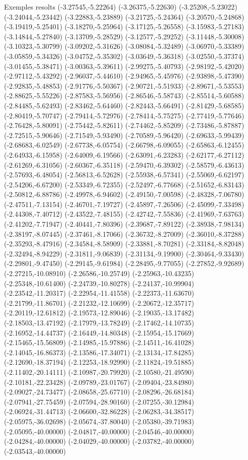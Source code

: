 \documentclass[11pt,a4paper]{article}
\begin{document}
\begin{fmex}{Exemples resolts}
(-3.27545,-5.22264) (-3.26375,-5.22630) (-3.25208,-5.23022) (-3.24044,-5.23442) (-3.22883,-5.23889) (-3.21725,-5.24364) (-3.20570,-5.24868) (-3.19419,-5.25401) (-3.18270,-5.25964) (-3.17125,-5.26558) (-3.15983,-5.27183) (-3.14844,-5.27840) (-3.13709,-5.28529) (-3.12577,-5.29252) (-3.11448,-5.30008) (-3.10323,-5.30799) (-3.09202,-5.31626) (-3.08084,-5.32489) (-3.06970,-5.33389) (-3.05859,-5.34326) (-3.04752,-5.35302) (-3.03649,-5.36318) (-3.02550,-5.37374) (-3.01455,-5.38471) (-3.00363,-5.39611) (-2.99275,-5.40793) (-2.98192,-5.42020) (-2.97112,-5.43292) (-2.96037,-5.44610) (-2.94965,-5.45976) (-2.93898,-5.47390) (-2.92835,-5.48853) (-2.91776,-5.50367) (-2.90721,-5.51933) (-2.89671,-5.53553) (-2.88625,-5.55226) (-2.87583,-5.56956) (-2.86546,-5.58743) (-2.85514,-5.60588) (-2.84485,-5.62493) (-2.83462,-5.64460) (-2.82443,-5.66491) (-2.81429,-5.68585) (-2.80419,-5.70747) (-2.79414,-5.72976) (-2.78414,-5.75275) (-2.77419,-5.77646) (-2.76428,-5.80091) (-2.75442,-5.82611) (-2.74462,-5.85209) (-2.73486,-5.87887) (-2.72515,-5.90646) (-2.71549,-5.93490) (-2.70589,-5.96420) (-2.69633,-5.99439) (-2.68683,-6.02549) (-2.67738,-6.05754) (-2.66798,-6.09055) (-2.65863,-6.12455) (-2.64933,-6.15958) (-2.64009,-6.19566) (-2.63091,-6.23283) (-2.62177,-6.27112) (-2.61269,-6.31056) (-2.60367,-6.35118) (-2.59470,-6.39302) (-2.58579,-6.43613) (-2.57693,-6.48054) (-2.56813,-6.52628) (-2.55938,-6.57341) (-2.55069,-6.62197) (-2.54206,-6.67200) (-2.53349,-6.72355) (-2.52497,-6.77668) (-2.51652,-6.83143) (-2.50812,-6.88786) (-2.49978,-6.94602) (-2.49150,-7.00598) (-2.48328,-7.06780) (-2.47511,-7.13154) (-2.46701,-7.19727) (-2.45897,-7.26506) (-2.45099,-7.33498) (-2.44308,-7.40712) (-2.43522,-7.48155) (-2.42742,-7.55836) (-2.41969,-7.63763) (-2.41202,-7.71947) (-2.40441,-7.80396) (-2.39687,-7.89122) (-2.38938,-7.98134) (-2.38197,-8.07445) (-2.37461,-8.17066) (-2.36732,-8.27009) (-2.36010,-8.37288) (-2.35293,-8.47916) (-2.34584,-8.58909) (-2.33881,-8.70281) (-2.33184,-8.82048) (-2.32494,-8.94229) (-2.31811,-9.06839) (-2.31134,-9.19900) (-2.30464,-9.33430) (-2.29801,-9.47450) (-2.29145,-9.61984) (-2.28495,-9.77055) (-2.27852,-9.92689) (-2.27215,-10.08910) (-2.26586,-10.25749) (-2.25963,-10.43235) (-2.25348,-10.61400) (-2.24739,-10.80278) (-2.24137,-10.99904) (-2.23542,-11.20317) (-2.22954,-11.41558) (-2.22373,-11.63670) (-2.21799,-11.86701) (-2.21232,-12.10699) (-2.20672,-12.35717) (-2.20119,-12.61812) (-2.19573,-12.89046) (-2.19035,-13.17482) (-2.18503,-13.47192) (-2.17979,-13.78249) (-2.17462,-14.10735) (-2.16952,-14.44737) (-2.16449,-14.80348) (-2.15954,-15.17669) (-2.15465,-15.56809) (-2.14985,-15.97886) (-2.14511,-16.41028) (-2.14045,-16.86373) (-2.13586,-17.34071) (-2.13134,-17.84285) (-2.12690,-18.37194) (-2.12253,-18.92990) (-2.11824,-19.51885) (-2.11402,-20.14111) (-2.10987,-20.79920) (-2.10580,-21.49590) (-2.10181,-22.23428) (-2.09789,-23.01767) (-2.09404,-23.84980) (-2.09027,-24.73477) (-2.08658,-25.67710) (-2.08296,-26.68184) (-2.07941,-27.75459) (-2.07594,-28.90160) (-2.07255,-30.12984) (-2.06924,-31.44713) (-2.06600,-32.86228) (-2.06283,-34.38517) (-2.05975,-36.02698) (-2.05674,-37.80040) (-2.05380,-39.71983) (-2.05095,-40.00000) (-2.04817,-40.00000) (-2.04546,-40.00000) (-2.04284,-40.00000) (-2.04029,-40.00000) (-2.03782,-40.00000) (-2.03543,-40.00000) 
\end{fmex}
\end{document}
